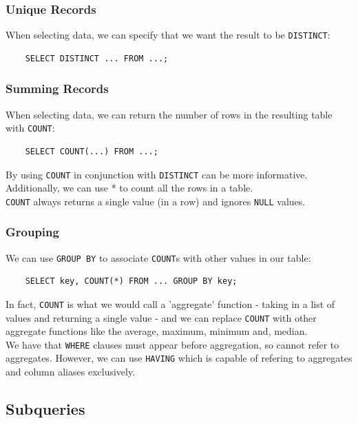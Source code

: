 \subsubsection{Unique Records}

When selecting data, we can specify that we want the result
to be \texttt{DISTINCT}: \begin{lstlisting}
    SELECT DISTINCT ... FROM ...;
\end{lstlisting}

\subsubsection{Summing Records}

When selecting data, we can return the number of rows
in the resulting table with \texttt{COUNT}: \begin{lstlisting}
    SELECT COUNT(...) FROM ...;
\end{lstlisting} By using \texttt{COUNT} in conjunction
with \texttt{DISTINCT} can be more informative.
Additionally, we can use * to count all the rows in a table.
\\[\baselineskip]
\texttt{COUNT} always returns a single value (in a row) and
ignores \texttt{NULL} values.

\subsubsection{Grouping}

We can use \texttt{GROUP BY} to associate \texttt{COUNT}s
with other values in our table: \begin{lstlisting}
    SELECT key, COUNT(*) FROM ... GROUP BY key;
\end{lstlisting} In fact, \texttt{COUNT} is what we would
call a 'aggregate' function - taking in a list of values
and returning a single value - and we can replace \texttt{COUNT}
with other aggregate functions like the average, maximum, minimum
and, median.
\\[\baselineskip]
We have that \texttt{WHERE} clauses must appear before
aggregation, so cannot refer to aggregates. However,
we can use \texttt{HAVING} which is capable of refering to
aggregates and column aliases exclusively.

\newpage

\subsection{Subqueries}

